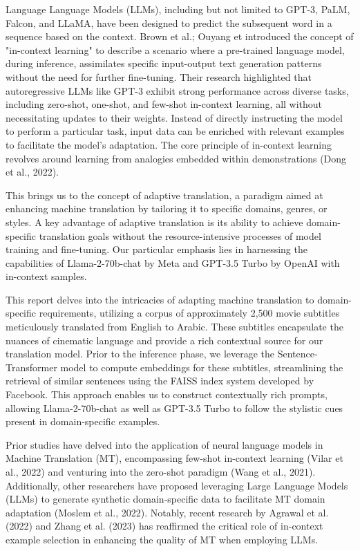 \documentclass[twocolumn]{article}
\begin{document}
Language Language Models (LLMs), including but not limited to GPT-3\cite{brown2020language}, PaLM\cite{chowdhery2022palm}, Falcon\cite{penedo2023refinedweb}, and LLaMA\cite{touvron2023llama}, have been designed to predict the subsequent word in a sequence based on the context. Brown et al.\cite{brown2020language}; Ouyang et\cite{ouyang2022training} introduced the concept of "in-context learning" to describe a scenario where a pre-trained language model, during inference, assimilates specific input-output text generation patterns without the need for further fine-tuning. Their research highlighted that autoregressive LLMs like GPT-3 exhibit strong performance across diverse tasks, including zero-shot, one-shot, and few-shot in-context learning, all without necessitating updates to their weights. Instead of directly instructing the model to perform a particular task, input data can be enriched with relevant examples to facilitate the model's adaptation. The core principle of in-context learning revolves around learning from analogies embedded within demonstrations (Dong et al., 2022)\cite{dong2022survey}.


This brings us to the concept of adaptive translation, a paradigm aimed at enhancing machine translation by tailoring it to specific domains, genres, or styles. A key advantage of adaptive translation is its ability to achieve domain-specific translation goals without the resource-intensive processes of model training and fine-tuning. Our particular emphasis lies in harnessing the capabilities of Llama-2-70b-chat by Meta and GPT-3.5 Turbo by OpenAI with in-context samples.

This report delves into the intricacies of adapting machine translation to domain-specific requirements, utilizing a corpus of approximately 2,500 movie subtitles meticulously translated from English to Arabic. These subtitles encapsulate the nuances of cinematic language and provide a rich contextual source for our translation model. Prior to the inference phase, we leverage the Sentence-Transformer model to compute embeddings for these subtitles, streamlining the retrieval of similar sentences using the FAISS index\cite{babenko2016efficient} system developed by Facebook. This approach enables us to construct contextually rich prompts, allowing Llama-2-70b-chat as well as GPT-3.5 Turbo to follow the stylistic cues present in domain-specific examples.

Prior studies have delved into the application of neural language models in Machine Translation (MT), encompassing few-shot in-context learning (Vilar et al., 2022)\cite{vilar2022prompting} and venturing into the zero-shot paradigm (Wang et al., 2021)\cite{wang2021language}. Additionally, other researchers have proposed leveraging Large Language Models (LLMs) to generate synthetic domain-specific data to facilitate MT domain adaptation (Moslem et al., 2022)\cite{moslem2022domain}. Notably, recent research by Agrawal et al. (2022)\cite{agrawal2022context} and Zhang et al. (2023)\cite{zhang2023prompting} has reaffirmed the critical role of in-context example selection in enhancing the quality of MT when employing LLMs.
\end{document}
